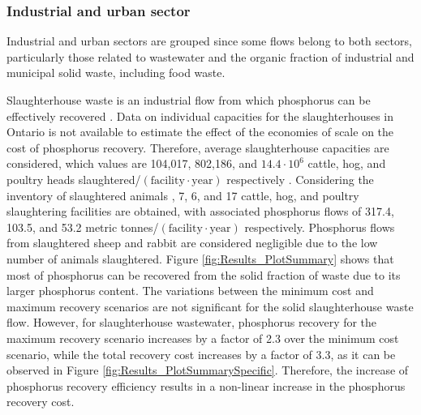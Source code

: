 \documentclass[]{elsarticle}
\begin{document}
\subsubsection{Industrial and urban sector}
Industrial and urban sectors are grouped since some flows belong to both sectors, particularly those related to wastewater and the organic fraction of industrial and municipal solid waste, including food waste.

Slaughterhouse waste is an industrial flow from which phosphorus can be effectively recovered \citep{Pearl2Kcost2}. Data on individual capacities for the slaughterhouses in Ontario is not available to estimate the effect of the economies of scale on the cost of phosphorus recovery. Therefore, average slaughterhouse capacities are considered, which values are 104,017, 802,186, and $14.4 \cdot 10^6$ cattle, hog, and poultry heads slaughtered/$\left(\text{facility} \cdot \text{year}\right) $ respectively \citep{SlaughterhouseDistribution, SlaughterhousePoultryAverageSize}. Considering the inventory of slaughtered animals \citep{SlaughterFederalRedMeat, SlaughterFederalPoultry}, 7, 6, and 17 cattle, hog, and poultry slaughtering facilities are obtained, with associated phosphorus flows of 317.4, 103.5, and 53.2 metric tonnes/$\left(\text{facility} \cdot \text{year}\right) $ respectively. Phosphorus flows from slaughtered sheep and rabbit are considered negligible due to the low number of animals slaughtered. Figure \ref{fig:Results_PlotSummary} shows that most of phosphorus can be recovered from the solid fraction of waste due to its larger phosphorus content. The variations between the minimum cost and maximum recovery scenarios are not significant for the solid slaughterhouse waste flow. However, for slaughterhouse wastewater, phosphorus recovery for the maximum recovery scenario increases by a factor of 2.3  over the minimum cost scenario, while the total recovery cost increases by a factor of 3.3, as it can be observed in Figure \ref{fig:Results_PlotSummarySpecific}. Therefore, the increase of phosphorus recovery efficiency results in a non-linear increase in the phosphorus recovery cost.
\end{document}
